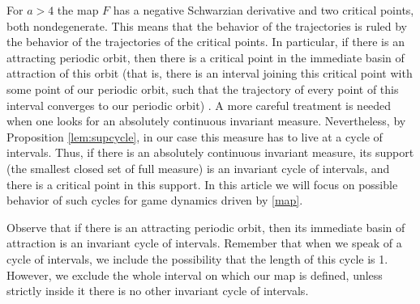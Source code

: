 \documentclass[format=acmsmall, authorversion, screen=true]{acmart}
\begin{document}
For $a>4$ the map $F$ has a negative Schwarzian derivative and two critical
points, both nondegenerate. This means that the behavior of the
trajectories is ruled by the behavior of the trajectories of the
critical points. In particular, if there is an attracting periodic
orbit, then there is a critical point in the immediate basin of
attraction of this orbit (that is, there is an interval joining
this critical point with some point of our periodic orbit, such
that the trajectory of every point of this interval converges to
our periodic orbit) \cite{de2012one}. 
A more careful treatment is needed when one looks for an absolutely continuous invariant measure. Nevertheless, by Proposition \ref{lem:supcycle}, in our case this measure has to live at a cycle of intervals.
Thus, if there is an absolutely continuous invariant measure, its support (the smallest
closed set of full measure) is an invariant cycle of intervals,
and there is a critical point in this support. In this article we will focus on possible behavior of such cycles for game dynamics driven by \eqref{map}. %

Observe that if there is an attracting periodic orbit, then its
immediate basin of attraction is an invariant cycle of intervals.
Remember that when we speak of a cycle of intervals, we include the
possibility that the length of this cycle is 1. However, we exclude
the whole interval on which our map is defined, unless strictly inside
it there is no other invariant cycle of intervals.
\end{document}
